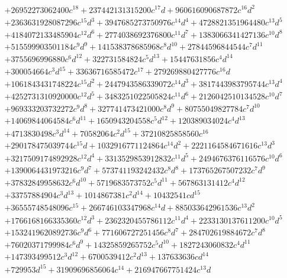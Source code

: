 {\begin{align*}
&+26952273062400c^{18}+237442131315200c^{17}d+960616090687872c^{16}d^{2}\\
&+2363631928087296c^{15}d^{3}+3947685273750976c^{14}d^{4}+4728821351964480c^{13}d^{5}\\
&+4184072133485904c^{12}d^{6}+2774038692376800c^{11}d^{7}+1383066341427136c^{10}d^{8}\\
&+515599903501184c^{9}d^{9}+141538378685968c^{8}d^{10}+27844596844544c^{7}d^{11}\\
&+3755696996880c^{6}d^{12}+322731584824c^{5}d^{13}+15447631856c^{4}d^{14}\\
&+300054664c^{3}d^{15}+33636716585472c^{17}+279269880427776c^{16}d\\
&+1061843431748224c^{15}d^{2}+2447943586339072c^{14}d^{3}+3817443983795744c^{13}d^{4}\\
&+4252731310920000c^{12}d^{5}+3483251022505824c^{11}d^{6}+2126042510134528c^{10}d^{7}\\
&+969333203732272c^{9}d^{8}+327741473421000c^{8}d^{9}+80755049827784c^{7}d^{10}\\
&+14069844064584c^{6}d^{11}+1650943204558c^{5}d^{12}+120389034024c^{4}d^{13}\\
&+4713830498c^{3}d^{14}+70582064c^{2}d^{15}+37210825858560c^{16}\\
&+290178475039744c^{15}d+1032916771124864c^{14}d^{2}+2221164584671616c^{13}d^{3}\\
&+3217509174892928c^{12}d^{4}+3313529853912832c^{11}d^{5}+2494676376116576c^{10}d^{6}\\
&+1390064431973216c^{9}d^{7}+573741193242432c^{8}d^{8}+173765267507232c^{7}d^{9}\\
&+37832849958632c^{6}d^{10}+5719683573752c^{5}d^{11}+567863131412c^{4}d^{12}\\
&+33757884904c^{3}d^{13}+1014867381c^{2}d^{14}+10432541cd^{15}\\
&+36555748548096c^{15}+266746103347968c^{14}d+885033642961536c^{13}d^{2}\\
&+1766168166335360c^{12}d^{3}+2362320455786112c^{11}d^{4}+2233130137611200c^{10}d^{5}\\
&+1532419620892736c^{9}d^{6}+771606727251456c^{8}d^{7}+284702619884672c^{7}d^{8}\\
&+76020371799984c^{6}d^{9}+14325859265752c^{5}d^{10}+1827243060832c^{4}d^{11}\\
&+147393499512c^{3}d^{12}+6700539412c^{2}d^{13}+137633636cd^{14}\\
&+729953d^{15}+31909696856064c^{14}+216947667751424c^{13}d\\

\end{align*}}
